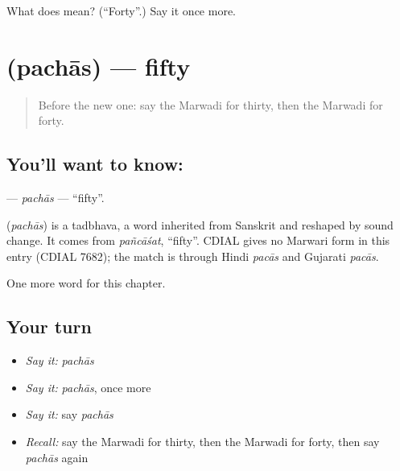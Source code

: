 \begin{tcolorbox}[breakable,colback=teal!4,colframe=teal!35!black,title={Before you move on}]
What does  mean? (\textquotedblleft{}Forty\textquotedblright{}.) Say it once more.
\end{tcolorbox}
\section[\texorpdfstring{\mw{पचास} (pachās)}{पचास (pachās)}]{ (pachās) — fifty}

\label{lesson:MW-C86-pachas}



\begin{quote}
Before the new one: say the Marwadi for thirty, then the Marwadi for forty.
\end{quote}

\subsection*{You'll want to know: }
\textbf{} — \emph{pachās} — \textquotedblleft{}fifty\textquotedblright{}.

\begin{cousinweb}
\textbf{} (\emph{pachās}) is a tadbhava, a word inherited from Sanskrit and reshaped by sound change. It comes from \emph{pañcāśat}, \textquotedblleft{}fifty\textquotedblright{}. CDIAL gives no Marwari form in this entry (CDIAL 7682); the match is through Hindi \emph{pacās} and Gujarati \emph{pacās}.
\end{cousinweb}

\begin{grammarlens}[title={What you've built}]
One more word for this chapter.
\end{grammarlens}

\subsection*{Your turn}
\begin{itemize}
\raggedright
  \item \emph{Say it:} \emph{pachās}
  \item \emph{Say it:} \emph{pachās}, once more
  \item \emph{Say it:} say \emph{pachās}
  \item \emph{Recall:} say the Marwadi for thirty, then the Marwadi for forty, then say \emph{pachās} again
\end{itemize}

